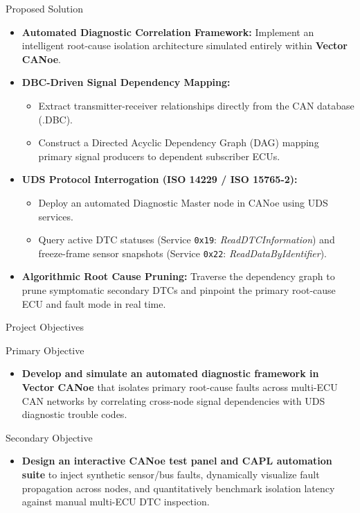 \documentclass[aspectratio=169, 10pt]{beamer}
\begin{document}
\begin{frame}{Proposed Solution}
  \begin{itemize}
    \item \textbf{Automated Diagnostic Correlation Framework:} Implement an intelligent root-cause isolation architecture simulated entirely within \textbf{Vector CANoe}.
    \item \textbf{DBC-Driven Signal Dependency Mapping:}
    \begin{itemize}
      \item Extract transmitter-receiver relationships directly from the CAN database (.DBC).
      \item Construct a Directed Acyclic Dependency Graph (DAG) mapping primary signal producers to dependent subscriber ECUs.
    \end{itemize}
    \item \textbf{UDS Protocol Interrogation (ISO 14229 / ISO 15765-2):}
    \begin{itemize}
      \item Deploy an automated Diagnostic Master node in CANoe using UDS services.
      \item Query active DTC statuses (Service \texttt{0x19}: \textit{ReadDTCInformation}) and freeze-frame sensor snapshots (Service \texttt{0x22}: \textit{ReadDataByIdentifier}).
    \end{itemize}
    \item \textbf{Algorithmic Root Cause Pruning:} Traverse the dependency graph to prune symptomatic secondary DTCs and pinpoint the primary root-cause ECU and fault mode in real time.
  \end{itemize}
\end{frame}

\begin{frame}{Project Objectives}
  \begin{block}{Primary Objective}
    \begin{itemize}
      \item \textbf{Develop and simulate an automated diagnostic framework in Vector CANoe} that isolates primary root-cause faults across multi-ECU CAN networks by correlating cross-node signal dependencies with UDS diagnostic trouble codes.
    \end{itemize}
  \end{block}

  \vspace{0.5cm}

  \begin{block}{Secondary Objective}
    \begin{itemize}
      \item \textbf{Design an interactive CANoe test panel and CAPL automation suite} to inject synthetic sensor/bus faults, dynamically visualize fault propagation across nodes, and quantitatively benchmark isolation latency against manual multi-ECU DTC inspection.
    \end{itemize}
  \end{block}
\end{frame}
\end{document}
